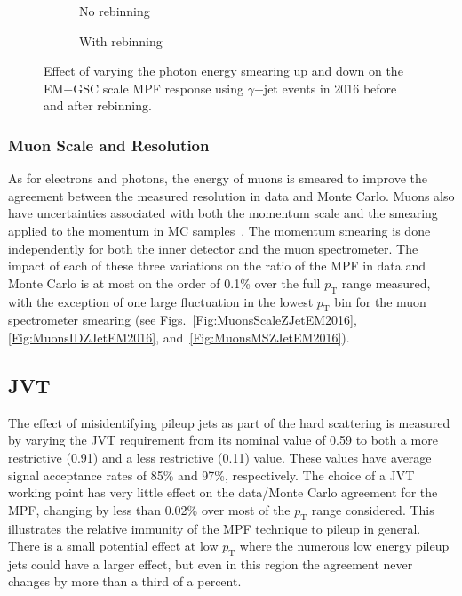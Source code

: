 \begin{figure}[!ht]
\centering
\begin{subfigure}{.5\textwidth}
\centering
{}
\caption{No rebinning}
\end{subfigure}%
\begin{subfigure}{.5\textwidth}  \centering
{}
\caption{With rebinning}
\end{subfigure}
\caption{Effect of varying the photon energy smearing up and down on the EM+GSC scale MPF response using $\gamma$+jet events in 2016 before and after rebinning. }
\label{Fig:EGResolutionGJetEM2016}
\end{figure}

\subsubsection{Muon Scale and Resolution}
As for electrons and photons, the energy of muons is smeared to improve the agreement between the measured resolution in data and Monte Carlo.  
Muons also have uncertainties associated with both the momentum scale and the smearing applied to the momentum in MC samples~\cite{Aad:2016jkr}.  
The momentum smearing is done independently for both the inner detector and the muon spectrometer.  
The impact of each of these three variations on the ratio of the MPF in data and Monte Carlo is at most on the order of 0.1\% over the full $p_{\mathrm T}$ range measured, with the exception of one large fluctuation in the lowest $p_{\mathrm T}$ bin for the muon spectrometer smearing (see Figs.~\ref{Fig:MuonsScaleZJetEM2016}, \ref{Fig:MuonsIDZJetEM2016}, and~\ref{Fig:MuonsMSZJetEM2016}).  


\subsection{JVT}

The effect of misidentifying pileup jets as part of the hard scattering is measured by varying the JVT requirement from its nominal value of 0.59 to both a more restrictive (0.91) and a less restrictive (0.11) value.  
These values have average signal acceptance rates of 85\% and 97\%, respectively.  
The choice of a JVT working point has very little effect on the data/Monte Carlo agreement for the MPF, changing by less than 0.02\% over most of the $p_{\mathrm T}$ range considered.  
This illustrates the relative immunity of the MPF technique to pileup in general.  
There is a small potential effect at low $p_{\mathrm T}$ where the numerous low energy pileup jets could have a larger effect, but even in this region the agreement never changes by more than a third of a percent.  


